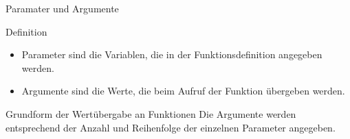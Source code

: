 \documentclass[xelatex,aspectratio=169]{beamer}
\begin{document}
\begin{frame}{Paramater und Argumente}
  \begin{exampleblock}{Definition}
    \begin{itemize}
      \item Parameter sind die Variablen, die in der Funktionsdefinition angegeben werden.
      \item Argumente sind die Werte, die beim Aufruf der Funktion übergeben werden.
    \end{itemize}
  \end{exampleblock}
  \begin{block}{Grundform der Wertübergabe an Funktionen}
    Die Argumente werden entsprechend der Anzahl und Reihenfolge der einzelnen Parameter angegeben.
  \end{block}

  \begin{columns}[t]
    \begin{column}{.35\linewidth}
      \inputminted[lastline=4,escapeinside=??]{python}{src/algorithmus_parameter.py}
    \end{column}
    \begin{column}{.65\linewidth}
      \inputminted[firstline=7,escapeinside=??]{python}{src/algorithmus_parameter.py}
    \end{column}
  \end{columns}


\end{frame}
\end{document}
